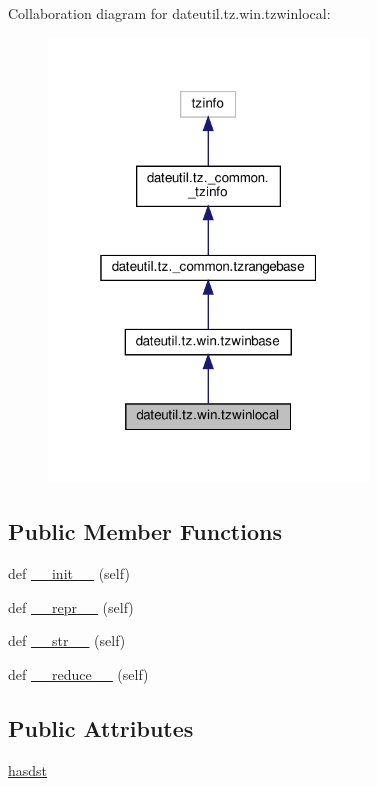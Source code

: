 Collaboration diagram for dateutil.\+tz.\+win.\+tzwinlocal\+:
\nopagebreak
\begin{figure}[H]
\begin{center}
\leavevmode
\includegraphics[width=241pt]{classdateutil_1_1tz_1_1win_1_1tzwinlocal__coll__graph}
\end{center}
\end{figure}
\subsection*{Public Member Functions}
\begin{DoxyCompactItemize}
\item 
def \hyperlink{classdateutil_1_1tz_1_1win_1_1tzwinlocal_a570ce1705314b330918aa8cdd7d09471}{\+\_\+\+\_\+init\+\_\+\+\_\+} (self)
\item 
def \hyperlink{classdateutil_1_1tz_1_1win_1_1tzwinlocal_aa0a561ee386195a89323a4f0cdb8c2cb}{\+\_\+\+\_\+repr\+\_\+\+\_\+} (self)
\item 
def \hyperlink{classdateutil_1_1tz_1_1win_1_1tzwinlocal_ae06350d6ca3552f34b8bc607f545f88f}{\+\_\+\+\_\+str\+\_\+\+\_\+} (self)
\item 
def \hyperlink{classdateutil_1_1tz_1_1win_1_1tzwinlocal_ac15c3fe43fb4a0baddc6120c9be4d87c}{\+\_\+\+\_\+reduce\+\_\+\+\_\+} (self)
\end{DoxyCompactItemize}
\subsection*{Public Attributes}
\begin{DoxyCompactItemize}
\item 
\hyperlink{classdateutil_1_1tz_1_1win_1_1tzwinlocal_a7682b0615eb960c3c2e1570012fbaf56}{hasdst}
\end{DoxyCompactItemize}
